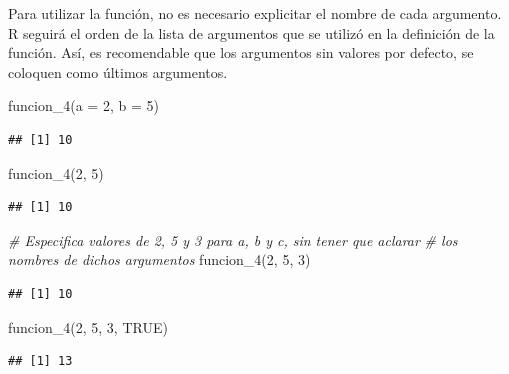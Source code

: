 \documentclass[
]{book}
\newenvironment{Shaded}{\begin{snugshade}}{\end{snugshade}}
\newcommand{\AttributeTok}[1]{\textcolor[rgb]{0.77,0.63,0.00}{#1}}
\newcommand{\CommentTok}[1]{\textcolor[rgb]{0.56,0.35,0.01}{\textit{#1}}}
\newcommand{\ConstantTok}[1]{\textcolor[rgb]{0.00,0.00,0.00}{#1}}
\newcommand{\DecValTok}[1]{\textcolor[rgb]{0.00,0.00,0.81}{#1}}
\newcommand{\FunctionTok}[1]{\textcolor[rgb]{0.00,0.00,0.00}{#1}}
\newcommand{\NormalTok}[1]{#1}
\begin{document}
Para utilizar la función, no es necesario explicitar el nombre de cada
argumento. R seguirá el orden de la lista de argumentos que se utilizó en la
definición de la función. Así, es recomendable que los argumentos sin valores
por defecto, se coloquen como últimos argumentos.

\begin{Shaded}
\begin{Highlighting}[]
\FunctionTok{funcion\_4}\NormalTok{(}\AttributeTok{a =} \DecValTok{2}\NormalTok{, }\AttributeTok{b =} \DecValTok{5}\NormalTok{)}
\end{Highlighting}
\end{Shaded}

\begin{verbatim}
## [1] 10
\end{verbatim}

\begin{Shaded}
\begin{Highlighting}[]
\FunctionTok{funcion\_4}\NormalTok{(}\DecValTok{2}\NormalTok{, }\DecValTok{5}\NormalTok{)}
\end{Highlighting}
\end{Shaded}

\begin{verbatim}
## [1] 10
\end{verbatim}

\begin{Shaded}
\begin{Highlighting}[]
\CommentTok{\# Especifica valores de 2, 5 y 3 para a, b y c, sin tener que aclarar }
\CommentTok{\# los nombres de dichos argumentos}
\FunctionTok{funcion\_4}\NormalTok{(}\DecValTok{2}\NormalTok{, }\DecValTok{5}\NormalTok{, }\DecValTok{3}\NormalTok{)     }
\end{Highlighting}
\end{Shaded}

\begin{verbatim}
## [1] 10
\end{verbatim}

\begin{Shaded}
\begin{Highlighting}[]
\FunctionTok{funcion\_4}\NormalTok{(}\DecValTok{2}\NormalTok{, }\DecValTok{5}\NormalTok{, }\DecValTok{3}\NormalTok{, }\ConstantTok{TRUE}\NormalTok{)    }
\end{Highlighting}
\end{Shaded}

\begin{verbatim}
## [1] 13
\end{verbatim}
\end{document}
